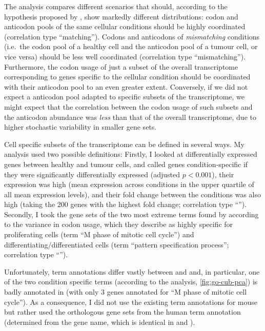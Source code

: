 The analysis compares different scenarios that should, according to the
hypothesis proposed by \citet{Gingold:2014}, show markedly different
distributions: codon and anticodon pools of the same cellular conditions should
be highly coordinated (correlation type “matching”). Codons and anticodons of
\emph{mismatching} conditions (i.e.\ the codon pool of a healthy cell and the
anticodon pool of a tumour cell, or vice versa) should be less well coordinated
(correlation type “mismatching”). Furthermore, the codon usage of just a subset
of the overall transcriptome corresponding to genes specific to the cellular
condition should be coordinated with their anticodon pool to an even greater
extent. Conversely, if we did not expect a \trna anticodon pool adapted to
specific subsets of the transcriptome, we might expect that the correlation
between the codon usage of such subsets and the anticodon abundance was
\emph{less} than that of the overall transcriptome, due to higher stochastic
variability in smaller gene sets.

Cell specific subsets of the transcriptome can be defined in several ways. My
analysis used two possible definitions: Firstly, I looked at differentially
expressed genes between healthy and tumour cells, and called genes
condition-specific if they were significantly differentially expressed (adjusted
\(p < 0.001\)), their expression was high (mean expression across conditions in
the upper quartile of all mean expression levels), and their fold change between
the conditions was also high (taking the \num{200} genes with the highest fold
change; correlation type “”). Secondly, I took the gene sets of the two
most extreme \go terms found by \citet{Gingold:2014} according to the variance
in codon usage, which they describe as highly specific for proliferating cells
(\go term “M phase of mitotic cell cycle”) and differentiating/differentiated
cells (\go term “pattern specification process”; correlation type “”).

Unfortunately, \go term annotations differ vastly between \hsa and \mmu and, in
particular, one of the two condition specific \go terms (according to the \pca
analysis, \cref{fig:go-cub-pca}) is badly annotated in \mmu (with only \num{3}
genes annotated for “M phase of mitotic cell cycle”). As a consequence, I did
not use the existing \go term annotations for mouse but rather used the
orthologous gene sets from the human \go term annotation (determined from the
gene name, which is identical in \mmu and \hsa \citep{Wain:2002}).

